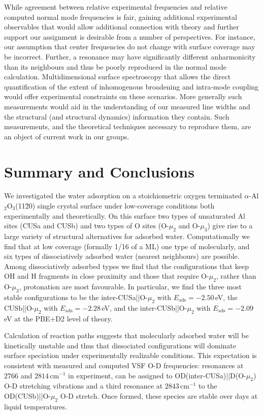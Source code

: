 \documentclass[twoside,twocolumn,9pt]{article}
\begin{document}
While agreement between relative experimental frequencies and relative computed normal mode frequencies is fair, gaining additional experimental observables that would allow additional connection with theory and further support 
 our assignment is desirable from a number 
 of perspectives. For instance, 
 our assumption that center frequencies do not change with surface coverage may be incorrect. Further, a resonance may have significantly different anharmonicity than its neighbours and thus be poorly reproduced in the normal mode calculation. Multidimensional surface spectroscopy that allows the direct quantification of the extent of inhomogenous broadening and intra-mode coupling would offer experimental constraints on these scenarios. More generally such measurements would aid in the understanding of our measured line widths and the structural (and structural dynamics) information they contain. Such measurements, and the theoretical techniques necessary to reproduce them, are an object of current work in our groups.






\section{Summary and Conclusions}
\label{sec4}
We investigated the water adsorption on a stoichiometric oxygen terminated $\alpha$-Al$_{2}$O$_{3}$(11\=20) single crystal surface under low-coverage conditions both experimentally and theoretically. On this surface two types of unsaturated Al sites (CUSa and CUSb) and two types of O sites (O-$\mu_2$ and O-$\mu_3$) give rise to a large variety of structural alternatives for adsorbed water. Computationally we find that at low coverage (formally 1/16 of a ML) one type of molecularly, and six types of dissociatively adsorbed water (nearest neighbours) are possible. Among dissociatively adsorbed types we find that the configurations that keep OH and H fragments in close proximity and those that require O-$\mu_2$, rather than O-$\mu_3$, protonation are most favourable. In particular, we find the three most stable configurations to be the inter-CUSa||O-$\mu_2$ with $E_\text{ads}=-2.50\,$eV, the CUSb||O-$\mu_2$ with $E_\text{ads}=-2.28\,$eV, and the inter-CUSb||O-$\mu_2$ with $E_\text{ads}=-2.09\,$eV at the PBE+D2 level of theory.

Calculation of reaction paths suggests that molecularly adsorbed water will be kinetically unstable and thus that dissociated configurations will dominate surface speciation under experimentally realizable conditions. This expectation is consistent with measured and computed VSF O-D frequencies: resonances at $2766$ and $2814\,$cm$^{-1}$ in experiment, can be assigned to OD(inter-CUSa)||D(O-$\mu_2$) O-D stretching vibrations and a third resonance at $2843\,$cm$^{-1}$ to the OD(CUSb)||O-$\mu_2$ O-D stretch. Once formed, these species are stable over days at liquid  temperatures.
%
\end{document}
